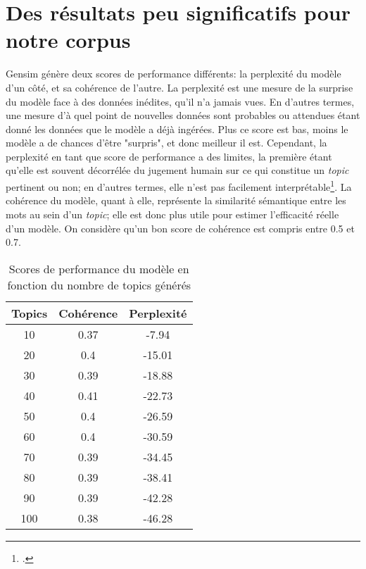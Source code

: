  

\section{Des résultats peu significatifs pour notre corpus}

Gensim génère deux scores de performance différents: la perplexité du modèle d'un côté, et sa cohérence de l'autre. La perplexité est une mesure de la surprise du modèle face à des données inédites, qu'il n'a jamais vues. En d'autres termes, une mesure d'à quel point de nouvelles données sont probables ou attendues étant donné les données que le modèle a déjà ingérées. Plus ce score est bas, moins le modèle a de chances d'être "surpris", et donc meilleur il est. Cependant, la perplexité en tant que score de performance a des limites, la première étant qu'elle est souvent décorrélée du jugement humain sur ce qui constitue un \textit{topic} pertinent ou non; en d'autres termes, elle n'est pas facilement interprétable\footcites{changReadingTeaLeaves2009}.  La cohérence du modèle, quant à elle, représente la similarité sémantique entre les mots au sein d'un \textit{topic}; elle est donc plus utile pour estimer l'efficacité réelle d'un modèle. On considère qu'un bon score de cohérence est compris entre 0.5 et 0.7. 

\begin{table}[ht]
	\centering
	\begin{tabular}{ccc}
		\hline
		\textbf{Topics} & \textbf{Cohérence} & \textbf{Perplexité} \\ \hline
		10                        & 0.37                        & -7.94                        \\
		20                        & 0.4                         & -15.01                       \\
		30                        & 0.39                        & -18.88                       \\
		40                        & 0.41                        & -22.73                       \\
		50                        & 0.4                         & -26.59                       \\
		60                        & 0.4                         & -30.59                       \\
		70                        & 0.39                        & -34.45                       \\
		80                        & 0.39                        & -38.41                       \\
		90                        & 0.39                        & -42.28                       \\ 
		100                       & 0.38                        & -46.28                       \\ \hline
	\end{tabular}
	\caption{Scores de performance du modèle en fonction du nombre de topics générés}
\end{table}

